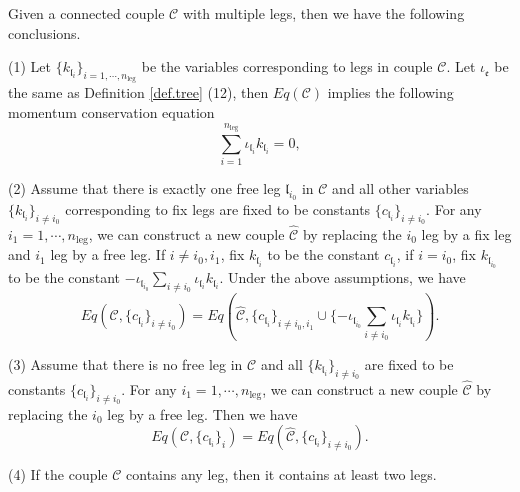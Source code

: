 \begin{lem}\label{lem.freeleg} %
Given a connected couple $\mathcal{C}$ with multiple legs, then we have the following conclusions.

(1) Let $\{k_{\mathfrak{l}_i}\}_{i=1,\cdots,n_{\text{leg}}}$ be the variables corresponding to legs in couple $\mathcal{C}$. Let $\iota_{\mathfrak{e}}$ be the same as Definition \ref{def.tree} (12), then $Eq(\mathcal{C})$ implies the following momentum conservation equation
\begin{equation}\label{eq.momentumconservation}
    \sum_{i=1}^{n_{\text{leg}}} \iota_{\mathfrak{l}_i}k_{\mathfrak{l}_i}=0,
\end{equation}

(2) Assume that there is exactly one free leg $\mathfrak{l}_{i_0}$ in $\mathcal{C}$ and all other variables $\{k_{\mathfrak{l}_{i}}\}_{i\ne i_0}$ corresponding to fix legs are fixed to be constants $\{c_{\mathfrak{l}_{i}}\}_{i\ne i_0}$. For any $i_{1}=1,\cdots,n_{\text{leg}}$, we can construct a new couple $\widehat{\mathcal{C}}$ by replacing the $i_0$ leg by a fix leg and $i_1$ leg by a free leg. If $i\ne i_0, i_1$, fix $k_{\mathfrak{l}_{i}}$ to be the constant $c_{\mathfrak{l}_{i}}$, if $i=i_0$, fix $k_{\mathfrak{l}_{i_0}}$ to be the constant $-\iota_{\mathfrak{l}_{i_0}}\sum_{i\ne i_0} \iota_{\mathfrak{l}_i}k_{\mathfrak{l}_i}$. Under the above assumptions, we have
\begin{equation}
    Eq(\mathcal{C}, \{c_{\mathfrak{l}_{i}}\}_{i\ne i_0})=Eq\left(\widehat{\mathcal{C}}, \{c_{\mathfrak{l}_{i}}\}_{i\ne i_0, i_1}\cup \{-\iota_{\mathfrak{l}_{i_0}}\sum_{i\ne i_0} \iota_{\mathfrak{l}_i}k_{\mathfrak{l}_i}\}\right).
\end{equation}

(3) Assume that there is no free leg in $\mathcal{C}$ and all $\{k_{\mathfrak{l}_{i}}\}_{i\ne i_0}$ are fixed to be constants $\{c_{\mathfrak{l}_{i}}\}_{i\ne i_0}$. For any $i_{1}=1,\cdots,n_{\text{leg}}$, we can construct a new couple $\widehat{\mathcal{C}}$ by replacing the $i_0$ leg by a free leg. Then we have
\begin{equation}
    Eq(\mathcal{C}, \{c_{\mathfrak{l}_{i}}\}_{i})=Eq(\widehat{\mathcal{C}}, \{c_{\mathfrak{l}_{i}}\}_{i\ne i_0}).
\end{equation}

(4) If the couple $\mathcal{C}$ contains any leg, then it contains at least two legs.

\end{lem}
